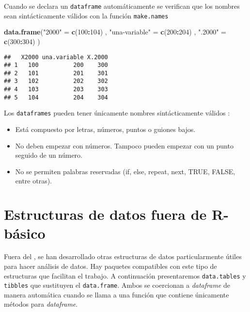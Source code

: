 \documentclass[]{article}
\newenvironment{Shaded}{\begin{snugshade}}{\end{snugshade}}
\newcommand{\KeywordTok}[1]{\textcolor[rgb]{0.13,0.29,0.53}{\textbf{#1}}}
\newcommand{\DecValTok}[1]{\textcolor[rgb]{0.00,0.00,0.81}{#1}}
\newcommand{\StringTok}[1]{\textcolor[rgb]{0.31,0.60,0.02}{#1}}
\newcommand{\OperatorTok}[1]{\textcolor[rgb]{0.81,0.36,0.00}{\textbf{#1}}}
\newcommand{\NormalTok}[1]{#1}
\begin{document}
Cuando se declara un \texttt{dataframe} automáticamente se verifican que
los nombres sean sintácticamente válidos con la función
\texttt{make.names}

\begin{Shaded}
\begin{Highlighting}[]
\KeywordTok{data.frame}\NormalTok{(}\StringTok{"2000"}\NormalTok{ =}\StringTok{ }\KeywordTok{c}\NormalTok{(}\DecValTok{100}\OperatorTok{:}\DecValTok{104}\NormalTok{)}
\NormalTok{           , }\StringTok{"una-variable"}\NormalTok{ =}\StringTok{ }\KeywordTok{c}\NormalTok{(}\DecValTok{200}\OperatorTok{:}\DecValTok{204}\NormalTok{)}
\NormalTok{           , }\StringTok{".2000"}\NormalTok{ =}\StringTok{ }\KeywordTok{c}\NormalTok{(}\DecValTok{300}\OperatorTok{:}\DecValTok{304}\NormalTok{)}
\NormalTok{)}
\end{Highlighting}
\end{Shaded}

\begin{verbatim}
##   X2000 una.variable X.2000
## 1   100          200    300
## 2   101          201    301
## 3   102          202    302
## 4   103          203    303
## 5   104          204    304
\end{verbatim}

\begin{curiosidad}
Los \texttt{dataframes} pueden tener únicamente nombres sintácticamente 
válidos \parencite[][sección \textit{What are valid names?}]{rfaq}:
\begin{itemize}
\item Está compuesto por letras, números, puntos o guiones bajos. 
\item No deben empezar con números. Tampoco pueden empezar con un punto seguido de un número.
\item No se permiten palabras reservadas (if, else, repeat, next, TRUE, FALSE, entre otras).
\end{itemize}
\end{curiosidad}

\section{Estructuras de datos fuera de
R-básico}\label{estructuras-de-datos-fuera-de-r-basico}

Fuera del \textcite{rbase}, se han desarrollado otras estructuras de
datos particularmente útiles para hacer análisis de datos. Hay paquetes
compatibles con este tipo de estructuras que facilitan el trabajo. A
continuación presentaremos \texttt{data.tables} y \texttt{tibbles} que
sustituyen el \texttt{data.frame}. Ambos se coercionan a
\emph{dataframe} de manera automática cuando se llama a una función que
contiene únicamente métodos para \emph{dataframe}.
\end{document}

